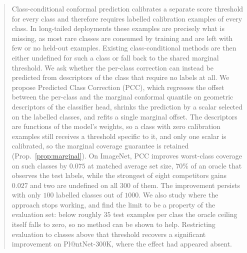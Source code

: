 \begin{abstract}
Class-conditional conformal prediction calibrates a separate score threshold for every class
and therefore requires labelled calibration examples of every class. In long-tailed
deployments these examples are precisely what is missing, as most rare classes are consumed
by training and are left with few or no held-out examples. Existing class-conditional methods
are then either undefined for such a class or fall back to the shared marginal threshold. We
ask whether the per-class correction can instead be predicted from descriptors of the class
that require no labels at all.
%
We propose Predicted Class Correction (PCC), which regresses the offset between the per-class
and the marginal conformal quantile on geometric descriptors of the classifier head, shrinks
the prediction by a scalar selected on the labelled classes, and refits a single marginal
offset. The descriptors are functions of the model's weights, so a class with zero
calibration examples still receives a threshold specific to it, and only one scalar is
calibrated, so the marginal coverage guarantee is retained (Prop.~\ref{prop:marginal}).
%
On ImageNet, PCC improves worst-class coverage on such classes by $0.075$ at matched average
set size, $70\%$ of an oracle that observes the test labels, while the strongest of eight
competitors gains $0.027$ and two are undefined on all $300$ of them. The improvement
persists with only $100$ labelled classes out of $1000$.
%
We also study where the approach stops working, and find the limit to be a property of the
evaluation set: below roughly $35$ test examples per class the oracle ceiling itself falls to
zero, so no method can be shown to help. Restricting evaluation to classes above that
threshold recovers a significant improvement on Pl@ntNet-300K, where the effect had appeared
absent.
\end{abstract}
